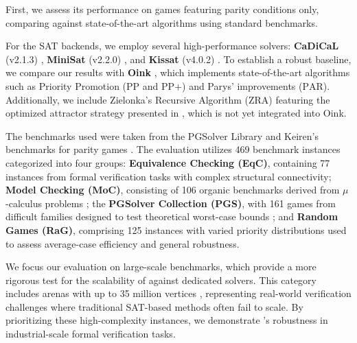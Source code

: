 \documentclass[a4paper,UKenglish,cleveref, autoref, thm-restate]{lipics-v2021}
\begin{document}
First, we assess its performance on games featuring parity conditions only, comparing \nocq against state-of-the-art algorithms using standard benchmarks.

For the SAT backends, we employ several high-performance solvers: \textbf{CaDiCaL} (v2.1.3) \cite{Biere:Kissat:2024}, \textbf{MiniSat} (v2.2.0) \cite{Een:MiniSat:2003}, and \textbf{Kissat} (v4.0.2) \cite{Biere:Kissat:2024}. To establish a robust baseline, we compare our results with \textbf{Oink} \cite{vanDijk:2018}, which implements state-of-the-art algorithms such as Priority Promotion ($\text{PP}$ and $\text{PP+}$) and Parys' improvements ($\text{PAR}$). Additionally, we include Zielonka's Recursive Algorithm ($\text{ZRA}$) featuring the optimized attractor strategy presented in \cite{Aggarwal:2023}, which is not yet integrated into Oink.

The benchmarks used were taken from the PGSolver Library \cite{Friedmann:2017} and Keiren's benchmarks for parity games \cite{Keiren:2015}. The evaluation utilizes 469 benchmark instances categorized into four groups: \textbf{Equivalence Checking (EqC)}, containing 77 instances from formal verification tasks with complex structural connectivity; \textbf{Model Checking (MoC)}, consisting of 106 organic benchmarks derived from $\mu$-calculus problems ; the \textbf{PGSolver Collection (PGS)}, with 161 games from difficult families designed to test theoretical worst-case bounds ; and \textbf{Random Games (RaG)}, comprising 125 instances with varied priority distributions used to assess average-case efficiency and general robustness.

We focus our evaluation on large-scale benchmarks, which provide a more rigorous test for the scalability of \nocq against dedicated solvers. This category includes arenas with up to 35 million vertices , representing real-world verification challenges where traditional SAT-based methods often fail to scale. By prioritizing these high-complexity instances, we demonstrate \nocq's robustness in industrial-scale formal verification tasks.
\end{document}
